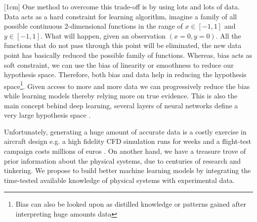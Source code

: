 [1cm]
One method to overcome this trade-off is by using lots and lots of data. Data acts as a hard constraint for learning algorithm, imagine a family of all possible continuous 2-dimensional functions in the range of $x \in [-1, 1]$ and $y \in [-1, 1]$. What will happen, given an observation $(x = 0, y = 0)$. All the functions that do not pass through this point will be eliminated, the new data point has basically reduced the possible family of functions. Whereas, bias acts as soft constraint, we can use the bias of linearity or smoothness to reduce our hypothesis space. Therefore, both bias and data help in reducing the hypothesis space\footnote{Bias can also be looked upon as distilled knowledge or patterns gained after interpreting huge amounts data}. Given access to more and more data we can progressively reduce the bias while learning models thereby relying more on true evidence. This is also the main concept behind deep learning, several layers of neural networks define a very large hypothesis space \cite{Goodfellow-et-al-2016, lecun2015deep}. 

Unfortunately, generating a huge amount of accurate data is a costly exercise in aircraft design e.g. a high fidelity CFD simulation runs for weeks \cite{murthy2014computational, jameson2012computational} and a flight-test campaign costs millions of euros \cite{fox2004test}. On another hand, we have a treasure trove of prior information about the physical systems, due to centuries of research and tinkering. We propose to build better machine learning models by integrating the time-tested available knowledge of physical systems with experimental data. 

